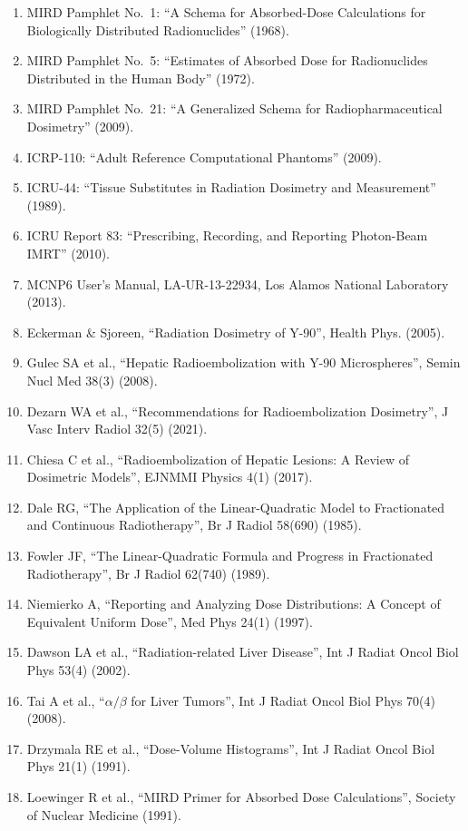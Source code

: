 \documentclass[12pt,a4paper]{article}
\begin{document}
\begin{enumerate}
  \item MIRD Pamphlet No.~1: ``A Schema for Absorbed-Dose Calculations for Biologically Distributed Radionuclides'' (1968).
  \item MIRD Pamphlet No.~5: ``Estimates of Absorbed Dose for Radionuclides Distributed in the Human Body'' (1972).
  \item MIRD Pamphlet No.~21: ``A Generalized Schema for Radiopharmaceutical Dosimetry'' (2009).
  \item ICRP-110: ``Adult Reference Computational Phantoms'' (2009).
  \item ICRU-44: ``Tissue Substitutes in Radiation Dosimetry and Measurement'' (1989).
  \item ICRU Report 83: ``Prescribing, Recording, and Reporting Photon-Beam IMRT'' (2010).
  \item MCNP6 User's Manual, LA-UR-13-22934, Los Alamos National Laboratory (2013).
  \item Eckerman \& Sjoreen, ``Radiation Dosimetry of Y-90'', Health Phys. (2005).
  \item Gulec SA et al., ``Hepatic Radioembolization with Y-90 Microspheres'', Semin Nucl Med 38(3) (2008).
  \item Dezarn WA et al., ``Recommendations for Radioembolization Dosimetry'', J Vasc Interv Radiol 32(5) (2021).
  \item Chiesa C et al., ``Radioembolization of Hepatic Lesions: A Review of Dosimetric Models'', EJNMMI Physics 4(1) (2017).
  \item Dale RG, ``The Application of the Linear-Quadratic Model to Fractionated and Continuous Radiotherapy'', Br J Radiol 58(690) (1985).
  \item Fowler JF, ``The Linear-Quadratic Formula and Progress in Fractionated Radiotherapy'', Br J Radiol 62(740) (1989).
  \item Niemierko A, ``Reporting and Analyzing Dose Distributions: A Concept of Equivalent Uniform Dose'', Med Phys 24(1) (1997).
  \item Dawson LA et al., ``Radiation-related Liver Disease'', Int J Radiat Oncol Biol Phys 53(4) (2002).
  \item Tai A et al., ``$\alpha/\beta$ for Liver Tumors'', Int J Radiat Oncol Biol Phys 70(4) (2008).
  \item Drzymala RE et al., ``Dose-Volume Histograms'', Int J Radiat Oncol Biol Phys 21(1) (1991).
  \item Loewinger R et al., ``MIRD Primer for Absorbed Dose Calculations'', Society of Nuclear Medicine (1991).

\end{enumerate}
\end{document}
